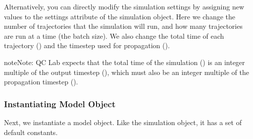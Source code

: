 \documentclass[letterpaper,10pt,english]{sphinxmanual}
\begin{document}
\sphinxAtStartPar
Alternatively, you can directly modify the simulation settings by assigning new values to the settings attribute of the simulation object. Here we change the number
of trajectories that the simulation will run, and how many trajectories are run at a time (the batch size). We also change the total time of each trajectory () and the
timestep used for propagation ().

\begin{sphinxadmonition}{note}{Note:}
\sphinxAtStartPar
QC Lab expects that the total time of the simulation () is an integer multiple of the output timestep (), which must also be an integer multiple
of the propagation timestep ().
\end{sphinxadmonition}

\begin{sphinxVerbatim}[commandchars=\\\{\}]
  
  
  
  
  
\end{sphinxVerbatim}


\subsubsection{Instantiating Model Object}
\label{\detokenize{user_guide/quickstart/quickstart:instantiating-model-object}}
\sphinxAtStartPar
Next, we instantiate a model object. Like the simulation object, it has a set of default constants.

\begin{sphinxVerbatim}[commandchars=\\\{\}]
  
 
\end{sphinxVerbatim}
\end{document}
